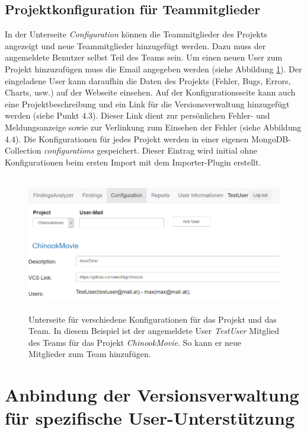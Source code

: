 \subsection{Projektkonfiguration für Teammitglieder}
In der Unterseite \textit{Configuration} können die Teammitglieder des Projekts angezeigt und neue Teammitglieder hinzugefügt werden. Dazu muss der angemeldete Benutzer selbst Teil des Teams sein. Um einen neuen User zum Projekt hinzuzufügen muss die Email angegeben werden (siehe Abbildung \ref{fig:configuration}). Der eingeladene User kann daraufhin die Daten des Projekts (Fehler, Bugs, Errors, Charts, usw.) auf der Webseite einsehen. Auf der Konfigurationsseite kann auch eine Projektbeschreibung und ein Link für die Versionsverwaltung hinzugefügt werden (siehe Punkt 4.3). Dieser Link dient zur persönlichen Fehler- und Meldungsanzeige sowie zur Verlinkung zum Einsehen der Fehler (siehe Abbildung 4.4). Die Konfigurationen für jedes Projekt werden in einer eigenen MongoDB-Collection \textit{configurations} gespeichert. Dieser Eintrag wird initial ohne Konfigurationen beim ersten Import mit dem Importer-Plugin  erstellt.
\begin{figure}[tp]
  \centering
  \includegraphics[height=6cm]{images/configuration.PNG}
 \caption[Konfiguration für das Projekt und Team]{Unterseite für verschiedene Konfigurationen für das Projekt und das Team. In diesem Beispiel ist der angemeldete User \textit{TestUser} Mitglied des Teams für das Projekt \textit{ChinookMovie}. So kann er neue Mitglieder zum Team hinzufügen.}
  \label{fig:configuration}
\end{figure}
\section{Anbindung der Versionsverwaltung für spezifische User-Unterstützung}
